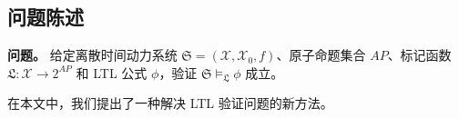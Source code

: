 


\subsection{问题陈述}
\textbf{问题。} 给定离散时间动力系统 $\mathfrak{S} = (\mathcal{X}, \mathcal{X}_0, f)$、原子命题集合 $AP$、标记函数 $\mathfrak{L}: \mathcal{X} \rightarrow 2^{AP}$ 和 LTL 公式 $\phi$，验证 $\mathfrak{S} \models_{\mathfrak{L}} \phi$ 成立。

\noindent
在本文中，我们提出了一种解决 LTL 验证问题的新方法。
